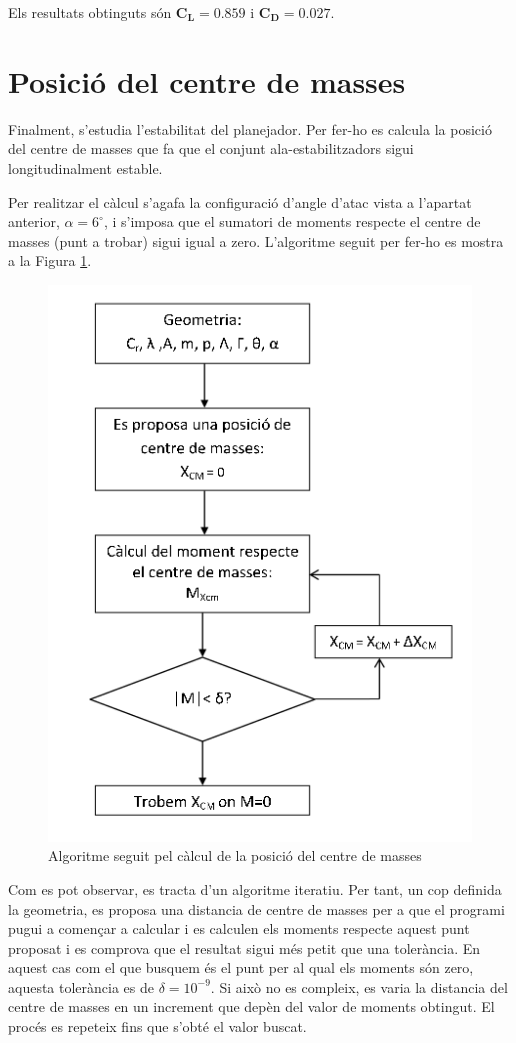Els resultats obtinguts són $\bm{C_{L} = 0.859} $ i $\bm{C_{D} = 0.027} $.


\section{Posició del centre de masses}

Finalment, s'estudia l'estabilitat del planejador. Per fer-ho es calcula la posició del centre de masses que fa que el conjunt ala-estabilitzadors sigui longitudinalment estable. 

Per realitzar el càlcul s'agafa la configuració d'angle d'atac vista a l'apartat anterior, $\alpha=6^{\circ}$, i s'imposa que el sumatori de moments respecte el centre de masses (punt a trobar) sigui igual a zero. L'algoritme seguit per fer-ho es mostra a la Figura \ref{AlgoritmeCM}.

\begin{figure}[H]
	\centering
	\includegraphics[scale=0.5]{./plots/algoritmeCM}
	\caption{Algoritme seguit pel càlcul de la posició del centre de masses}
	\label{AlgoritmeCM}
\end{figure}

Com es pot observar, es tracta d'un algoritme iteratiu. Per tant, un cop definida la geometria, es proposa una distancia de centre de masses per a que el programi pugui a començar a calcular i es calculen els moments respecte aquest punt proposat i es comprova que el resultat sigui més petit que una tolerància. En aquest cas com el que busquem és el punt per al qual els moments són zero, aquesta tolerància es de $\delta=10^{-9}$. Si això no es compleix, es varia la distancia del centre de masses en un increment que depèn del valor de moments obtingut. El procés es repeteix fins que s'obté el valor buscat. 

